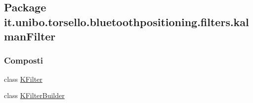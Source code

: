 \hypertarget{namespaceit_1_1unibo_1_1torsello_1_1bluetoothpositioning_1_1filters_1_1kalmanFilter}{}\subsection{Package it.\+unibo.\+torsello.\+bluetoothpositioning.\+filters.\+kalman\+Filter}
\label{namespaceit_1_1unibo_1_1torsello_1_1bluetoothpositioning_1_1filters_1_1kalmanFilter}
\subsubsection*{Composti}
\begin{DoxyCompactItemize}
\item 
class \hyperlink{classit_1_1unibo_1_1torsello_1_1bluetoothpositioning_1_1filters_1_1kalmanFilter_1_1KFilter}{K\+Filter}
\item 
class \hyperlink{classit_1_1unibo_1_1torsello_1_1bluetoothpositioning_1_1filters_1_1kalmanFilter_1_1KFilterBuilder}{K\+Filter\+Builder}
\end{DoxyCompactItemize}
